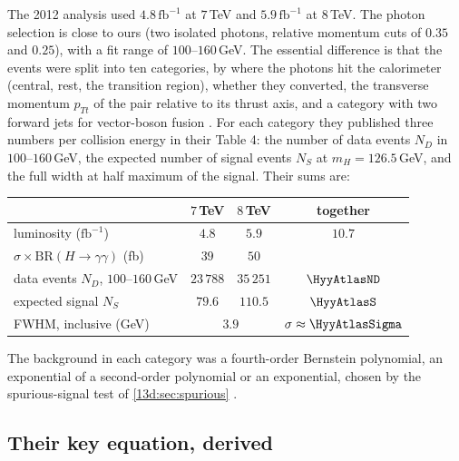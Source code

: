 The 2012 analysis used $4.8\,\mathrm{fb}^{-1}$ at $7\,$TeV and $5.9\,\mathrm{fb}^{-1}$ at
$8\,$TeV. The photon selection is close to ours (two isolated photons, relative momentum
cuts of $0.35$ and $0.25$), with a fit range of $100$--$160\,$GeV. The essential
difference is that the events were split into ten categories, by where the photons hit
the calorimeter (central, rest, the transition region), whether they converted, the
transverse momentum $p_{Tt}$ of the pair relative to its thrust axis, and a category with
two forward jets for vector-boson fusion . For each
category they published three numbers per collision energy in their Table 4: the number of
data events $N_D$ in $100$--$160\,$GeV, the expected number of signal events $N_S$ at
$m_H=126.5\,$GeV, and the full width at half maximum of the signal. Their sums are:
\begin{center}
\small
\begin{tabular}{@{}lccc@{}}
\toprule
 & $7\,$TeV & $8\,$TeV & together\\\midrule
luminosity ($\mathrm{fb}^{-1}$) & $4.8$ & $5.9$ & $10.7$\\
$\sigma\times\mathrm{BR}(H\to\gamma\gamma)$ (fb) & $39$ & $50$ & \\
data events $N_D$, $100$--$160\,$GeV & $23\,788$ & $35\,251$ & $\HyyAtlasND$\\
expected signal $N_S$ & $79.6$ & $110.5$ & $\HyyAtlasS$\\
FWHM, inclusive (GeV) & \multicolumn{2}{c}{$3.9$} & $\sigma\approx\HyyAtlasSigma$\\
\bottomrule
\end{tabular}
\end{center}
The background in each category was a fourth-order Bernstein polynomial, an exponential of
a second-order polynomial or an exponential, chosen by the spurious-signal test of
\cref{13d:sec:spurious} .

\subsection{Their key equation, derived}
\label{13d:sec:repro-equation}

